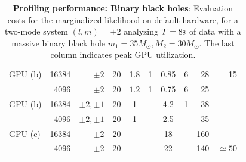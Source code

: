 \documentclass[twocolumn,prd,nofootinbib]{revtex4}
\newcommand\unit[1]{{\rm #1}}
\newcommand\editremark[1]{{\color{red} #1}}
\begin{document}
\begin{table}
\begin{tabular}{lrr|ccccc|rr}
GPU (b) & 16384 & $\pm 2$ & 20  & 1.8 & 1 & \editremark{0.85}& \editremark{6} &28 & 15\\
       & 4096 & $\pm 2$  & 20 & $1.2 $ &  1  & \editremark{0.75} & \editremark{6}  & 25\\ \hline
GPU (b) & 16384 & $\pm 2, \pm 1$ & 20 & 1 && 4.2 & \editremark{1}  & 38  \\
       & 4096 & $\pm 2, \pm 1$ & 20 & 1&& 2.5  && 35 & \\ \hline
%
GPU (c) & 16384 & $\pm 2 $  & 20  & & & 18& &160 &  \\
            & 4096 &$\pm 2 $  &  20 &  & & 22  & & 140 & $\simeq 50$ \\
\end{tabular}
\caption{\label{tab:CostBreakdown}\textbf{Profiling performance: Binary black holes}: Evaluation costs for the
  marginalized likelihood on default
  hardware, for a two-mode system $(l,m)=\pm 2$ analyzing $T=8\unit{s}$ of data with a massive binary black hole
  $m_1=35 M_\odot,M_2=30 M_\odot$.  The last column indicates peak GPU utilization.}
\end{table}
\end{document}
